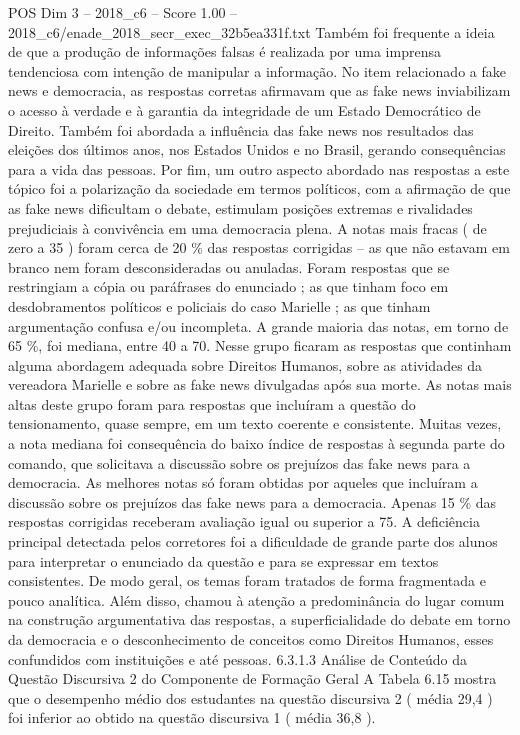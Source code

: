 \begin{textsample}{POS Dim 3 – 2018\_c6 – Score 1.00 – 2018\_c6/enade\_2018\_secr\_exec\_32b5ea331f.txt}
Também foi frequente a ideia de que a produção de informações falsas é realizada por uma imprensa tendenciosa com intenção de manipular a informação.
No item relacionado a fake news e democracia, as respostas corretas afirmavam que as fake news inviabilizam o acesso à verdade e à garantia da integridade de um Estado Democrático de Direito.
Também foi abordada a influência das fake news nos resultados das eleições dos últimos anos, nos Estados Unidos e no Brasil, gerando consequências para a vida das pessoas.
Por fim, um outro aspecto abordado nas respostas a este tópico foi a polarização da sociedade em termos políticos, com a afirmação de que as fake news dificultam o debate, estimulam posições extremas e rivalidades prejudiciais à convivência em uma democracia plena.
A notas mais fracas ( de zero a 35 ) foram cerca de 20 \% das respostas corrigidas – as que não estavam em branco nem foram desconsideradas ou anuladas.
Foram respostas que se restringiam a cópia ou paráfrases do enunciado ; as que tinham foco em desdobramentos políticos e policiais do caso Marielle ; as que tinham argumentação confusa e/ou incompleta.
A grande maioria das notas, em torno de 65 \%, foi mediana, entre 40 a 70.
Nesse grupo ficaram as respostas que continham alguma abordagem adequada sobre Direitos Humanos, sobre as atividades da vereadora Marielle e sobre as fake news divulgadas após sua morte.
As notas mais altas deste grupo foram para respostas que incluíram a questão do tensionamento, quase sempre, em um texto coerente e consistente.
Muitas vezes, a nota mediana foi consequência do baixo índice de respostas à segunda parte do comando, que solicitava a discussão sobre os prejuízos das fake news para a democracia.
As melhores notas só foram obtidas por aqueles que incluíram a discussão sobre os prejuízos das fake news para a democracia.
Apenas 15 \% das respostas corrigidas receberam avaliação igual ou superior a 75.
A deficiência principal detectada pelos corretores foi a dificuldade de grande parte dos alunos para interpretar o enunciado da questão e para se expressar em textos consistentes.
De modo geral, os temas foram tratados de forma fragmentada e pouco analítica.
Além disso, chamou à atenção a predominância do lugar comum na construção argumentativa das respostas, a superficialidade do debate em torno da democracia e o desconhecimento de conceitos como Direitos Humanos, esses confundidos com instituições e até pessoas. 6.3.1.3 Análise de Conteúdo da Questão Discursiva 2 do Componente de Formação Geral A Tabela 6.15 mostra que o desempenho médio dos estudantes na questão discursiva 2 ( média 29,4 ) foi inferior ao obtido na questão discursiva 1 ( média 36,8 ).

\end{textsample}
